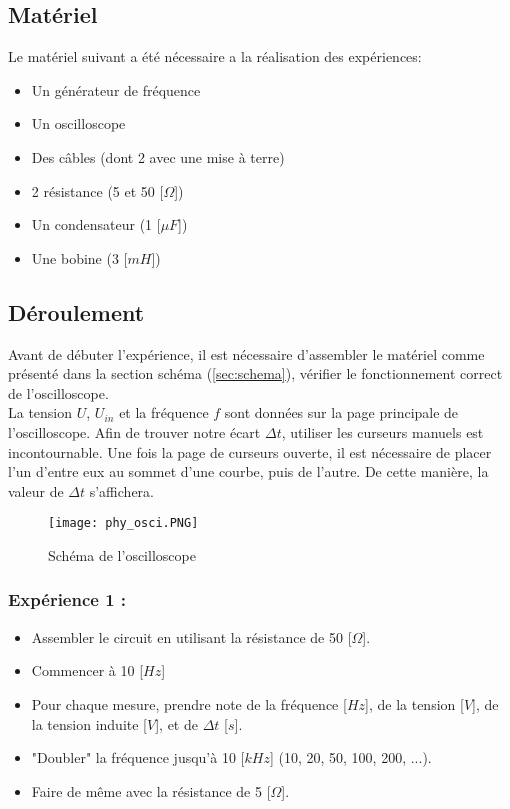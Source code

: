 
\subsection{Matériel}
Le matériel suivant a été nécessaire a la réalisation des expériences:\\
\begin{itemize}
	\item Un générateur de fréquence
	\item Un oscilloscope
	\item Des câbles (dont 2 avec une mise à terre)
	\item 2 résistance (5 et 50 [$\Omega$])
    \item Un condensateur (1 [$\mu F$])
    \item Une bobine (3 [$m H$])
\end{itemize}

\subsection{Déroulement}
Avant de débuter l'expérience, il est nécessaire d'assembler le matériel comme présenté dans la section schéma (\ref{sec:schema}), vérifier le fonctionnement correct de l'oscilloscope.\\

La tension $U$, $U_{in}$ et la fréquence $f$ sont données sur la page principale de l'oscilloscope. Afin de trouver notre écart $\Delta t$, utiliser les curseurs manuels est incontournable. Une fois la page de curseurs ouverte, il est nécessaire de placer l'un d'entre eux au sommet d'une courbe, puis de l'autre. De cette manière, la valeur de $\Delta t$ s'affichera.
\begin{figure}[H]
  \centering
    \texttt{[image: phy\_osci.PNG]}
    \caption{Schéma de l'oscilloscope}
\end{figure}

\subsubsection*{Expérience 1 :}
\begin{itemize}
    \item Assembler le circuit en utilisant la résistance de 50 [$\Omega$].
    \item Commencer à 10 [$Hz$]
    \item Pour chaque mesure, prendre note de la fréquence [$Hz$], de la tension [$V$], de la tension induite [$V$], et de $\Delta t$ [$s$].
    \item "Doubler" la fréquence jusqu'à 10 [$kHz$] (10, 20, 50, 100, 200, ...).
    \item Faire de même avec la résistance de 5 [$\Omega$].
\end{itemize}

